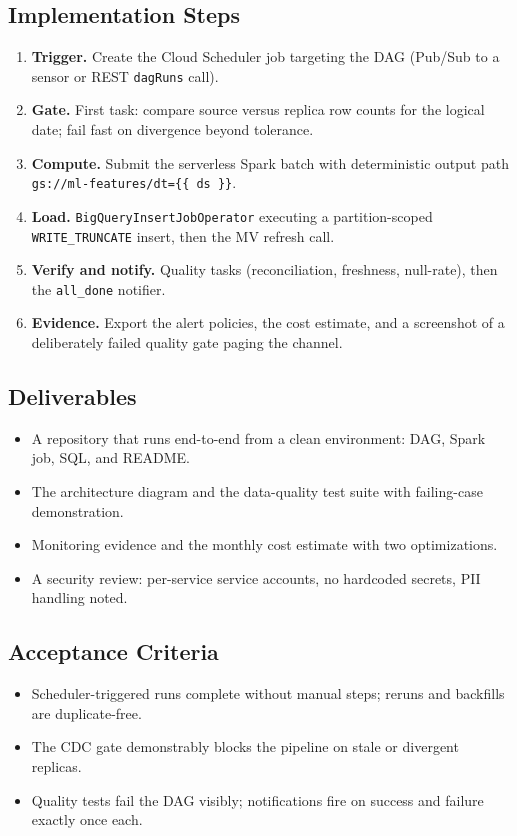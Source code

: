 \subsection*{Implementation Steps}
\begin{enumerate}
    \item \textbf{Trigger.} Create the Cloud Scheduler job targeting the DAG (Pub/Sub to a sensor or REST \texttt{dagRuns} call).
    \item \textbf{Gate.} First task: compare source versus replica row counts for the logical date; fail fast on divergence beyond tolerance.
    \item \textbf{Compute.} Submit the serverless Spark batch with deterministic output path \texttt{gs://ml-features/dt=\{\{ ds \}\}}.
    \item \textbf{Load.} \texttt{BigQueryInsertJobOperator} executing a partition-scoped \texttt{WRITE\_TRUNCATE} insert, then the MV refresh call.
    \item \textbf{Verify and notify.} Quality tasks (reconciliation, freshness, null-rate), then the \texttt{all\_done} notifier.
    \item \textbf{Evidence.} Export the alert policies, the cost estimate, and a screenshot of a deliberately failed quality gate paging the channel.
\end{enumerate}

\subsection*{Deliverables}
\begin{itemize}
    \item A repository that runs end-to-end from a clean environment: DAG, Spark job, SQL, and README.
    \item The architecture diagram and the data-quality test suite with failing-case demonstration.
    \item Monitoring evidence and the monthly cost estimate with two optimizations.
    \item A security review: per-service service accounts, no hardcoded secrets, PII handling noted.
\end{itemize}

\subsection*{Acceptance Criteria}
\begin{itemize}
    \item Scheduler-triggered runs complete without manual steps; reruns and backfills are duplicate-free.
    \item The CDC gate demonstrably blocks the pipeline on stale or divergent replicas.
    \item Quality tests fail the DAG visibly; notifications fire on success and failure exactly once each.
\end{itemize}

